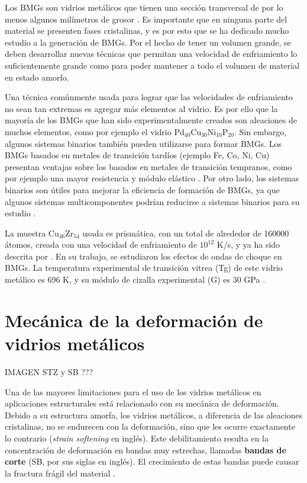 Los BMGs son vidrios metálicos que tienen una sección transversal de por lo menos algunos milímetros de grosor \cite{suryana11}. Es importante que en ninguna parte del material se presenten fases cristalinas, y es por esto que se ha dedicado mucho estudio a la generación de BMGs. Por el hecho de tener un volumen grande, se deben desarrollar nuevas técnicas que permitan una velocidad de enfriamiento lo suficientemente grande como para poder mantener a todo el volumen de material en estado amorfo.

Una técnica comúnmente usada para lograr que las velocidades de enfriamiento no sean tan extremas es agregar más elementos al vidrio. Es por ello que la mayoría de los BMGs que han sido experimentalmente creados son aleaciones de muchos elementos, como por ejemplo el vidrio Pd$_{40}$Cu$_{30}$Ni$_{10}$P$_{20}$. Sin embargo, algunos sistemas binarios también pueden utilizarse para formar BMGs. Los BMGs basados en metales de transición tardíos (ejemplo Fe, Co, Ni, Cu) presentan ventajas sobre los basados en metales de transición tempranos, como por ejemplo una mayor resistencia y módulo elástico \cite{Xu04}. Por otro lado, los sistemas binarios son útiles para mejorar la eficiencia de formación de BMGs, ya que algunos sistemas multicomponentes podrían reducirse a sistemas binarios para su estudio \cite{Duan05}.

La muestra Cu$_{46}$Zr$_{54}$ usada es prismática, con un total de alrededor de 160000 átomos, creada con una velocidad de enfriamiento de $10^{12}$ K/s, y ya ha sido descrita por \cite{arman10}. En su trabajo, se estudiaron los efectos de ondas de choque en BMGs. La temperatura experimental de transición vitrea (Tg) de este vidrio metálico es 696 K, y su módulo de cizalla experimental (G) es 30 GPa \cite{johnson05}. 


\section{Mecánica de la deformación de vidrios metálicos}
\label{S1_6}

IMAGEN STZ y SB ???

Una de las mayores limitaciones para el uso de los vidrios metálicos en aplicaciones estructurales está relacionado con su mecánica de deformación. Debido a su estructura amorfa, los vidrios metálicos, a diferencia de las aleaciones cristalinas, no se endurecen con la deformación, sino que les ocurre exactamente lo contrario (\textit{strain softening} en inglés). Este debilitamiento resulta en la concentración de deformación en bandas muy estrechas, llamadas \textbf{bandas de corte} (SB, por sus siglas en inglés). El crecimiento de estas bandas puede causar la fractura frágil del material \cite{schuh07}.

